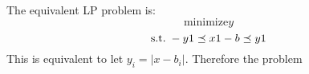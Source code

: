\message{ !name(ass4_ChangLi.tex)}\documentclass[10pt,a4paper]{article}
\begin{document}


The equivalent LP problem is:
$$
\text{minimize} y
$$
$$
\text{s.t.\;}  -y1 \preceq x1-b \preceq y1
$$
This is equivalent to let $y_i = |x - b_i|$. Therefore the
problem




\end{document}
